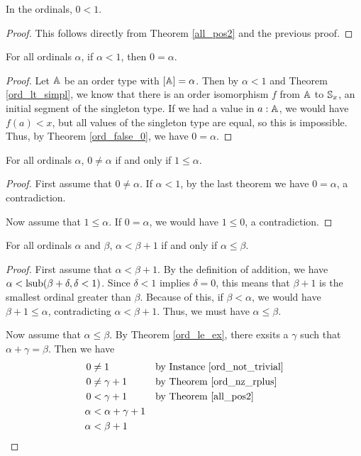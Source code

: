 \documentclass[../../math.tex]{subfiles}
\begin{document}
\begin{theorem} \label{ord_one_pos}
    In the ordinals, $0 < 1$.
\end{theorem}
\begin{proof}
    This follows directly from Theorem \ref{all_pos2} and the previous proof.
\end{proof}

\begin{theorem} \label{ord_lt_one_eq}
    For all ordinals $\alpha$, if $\alpha < 1$, then $0 = \alpha$.
\end{theorem}
\begin{proof}
    Let $\A$ be an order type with $[\A] = \alpha$.  Then by $\alpha < 1$ and
    Theorem \ref{ord_lt_simpl}, we know that there is an order isomorphism $f$
    from $\A$ to $\S_x$, an initial segment of the singleton type.  If we had a
    value in $a : \A$, we would have $f(a) < x$, but all values of the singleton
    type are equal, so this is impossible.  Thus, by Theorem \ref{ord_false_0},
    we have $0 = \alpha$.
\end{proof}

\begin{theorem} \label{ord_pos_one}
    For all ordinals $\alpha$, $0 \neq \alpha$ if and only if $1 \leq \alpha$.
\end{theorem}
\begin{proof}
    First assume that $0 \neq \alpha$.  If $\alpha < 1$, by the last theorem we
    have $0 = \alpha$, a contradiction.

    Now assume that $1 \leq \alpha$.  If $0 = \alpha$, we would have $1 \leq 0$,
    a contradiction.
\end{proof}

\begin{theorem} \label{ord_lt_suc_le}
    For all ordinals $\alpha$ and $\beta$, $\alpha < \beta + 1$ if and only if
    $\alpha \leq \beta$.
\end{theorem}
\begin{proof}
    First assume that $\alpha < \beta + 1$.  By the definition of addition, we
    have $\alpha < \lsub(\beta + \delta, \delta < 1)$.  Since $\delta < 1$
    implies $\delta = 0$, this means that $\beta + 1$ is the smallest ordinal
    greater than $\beta$.  Because of this, if $\beta < \alpha$, we would have
    $\beta + 1 \leq \alpha$, contradicting $\alpha < \beta + 1$.  Thus, we must
    have $\alpha \leq \beta$.

    Now assume that $\alpha \leq \beta$.  By Theorem \ref{ord_le_ex}, there
    exsits a $\gamma$ such that $\alpha + \gamma = \beta$.  Then we have
    \begin{align*}
        0 &\neq 1 && \text{by Instance \ref{ord_not_trivial}} \\
        0 &\neq \gamma + 1 && \text{by Theorem \ref{ord_nz_rplus}} \\
        0 &< \gamma + 1 && \text{by Theorem \ref{all_pos2}} \\
        \alpha &< \alpha + \gamma + 1 && \\
        \alpha &< \beta + 1 &&
    \end{align*}
\end{proof}
\end{document}

